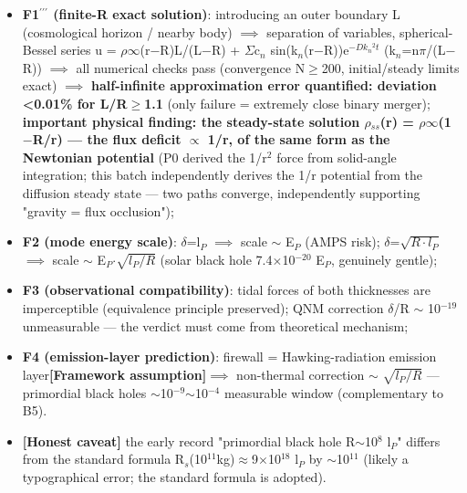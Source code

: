\documentclass[12pt]{article}
\newcommand{\mtag}[1]{\textbf{[#1]}}
\newcommand{\up}[1]{\ensuremath{^{#1}}}
\newcommand{\down}[1]{\ensuremath{_{#1}}}
\begin{document}
\begin{itemize}
\item \textbf{F1\ensuremath{^{\prime\prime\prime}} (finite-R exact solution)}: introducing an outer boundary L (cosmological horizon / nearby body) \ensuremath{\implies} separation of variables, spherical-Bessel series u = \ensuremath{\rho}\ensuremath{\infty}(r\ensuremath{-}R)L/(L\ensuremath{-}R) + \ensuremath{\Sigma}c\down{n} sin(k\down{n}(r\ensuremath{-}R))e\up{-Dk\down{n}^{2}t} (k\down{n}=n\ensuremath{\pi}/(L\ensuremath{-}R)) \ensuremath{\implies} all numerical checks pass (convergence N\ensuremath{\geq}200, initial/steady limits exact) \ensuremath{\implies} \textbf{half-infinite approximation error quantified: deviation <0.01\% for L/R\ensuremath{\geq}1.1} (only failure = extremely close binary merger); \textbf{important physical finding: the steady-state solution \ensuremath{\rho}\down{ss}(r) = \ensuremath{\rho}\ensuremath{\infty}(1\ensuremath{-}R/r) --- the flux deficit \ensuremath{\propto} 1/r, of the same form as the Newtonian potential} (P0 derived the 1/r\up{2} force from solid-angle integration; this batch independently derives the 1/r potential from the diffusion steady state --- two paths converge, independently supporting "gravity = flux occlusion");
\item \textbf{F2 (mode energy scale)}: \ensuremath{\delta}=l\down{P} \ensuremath{\implies} scale \ensuremath{\sim} E\down{P} (AMPS risk); \ensuremath{\delta}=\ensuremath{\sqrt{R\cdot{}l\down{P}}} \ensuremath{\implies} scale \ensuremath{\sim} E\down{P}\ensuremath{\cdot}\ensuremath{\sqrt{l\down{P}/R}} (solar black hole 7.4\ensuremath{\times}10\up{-20} E\down{P}, genuinely gentle);
\item \textbf{F3 (observational compatibility)}: tidal forces of both thicknesses are imperceptible (equivalence principle preserved); QNM correction \ensuremath{\delta}/R \ensuremath{\sim} 10\up{-19} unmeasurable --- the verdict must come from theoretical mechanism;
\item \textbf{F4 (emission-layer prediction)}: firewall = Hawking-radiation emission layer\mtag{Framework assumption}\ensuremath{\implies} non-thermal correction \ensuremath{\sim} \ensuremath{\sqrt{l\down{P}/R}} --- primordial black holes \ensuremath{\sim}10\up{-9}\ensuremath{\sim}10\up{-4} measurable window (complementary to B5).
\item \mtag{Honest caveat} the early record "primordial black hole R\ensuremath{\sim}10\up{8} l\down{P}" differs from the standard formula R\down{s}(10\up{11}kg)\ensuremath{\approx}9\ensuremath{\times}10\up{18} l\down{P} by \ensuremath{\sim}10\up{11} (likely a typographical error; the standard formula is adopted).
\end{itemize}
\end{document}
